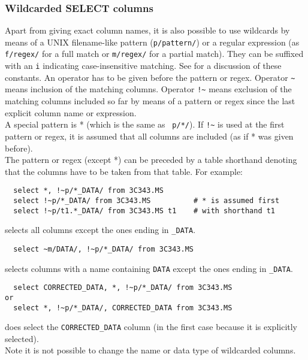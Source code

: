 \subsubsection{Wildcarded SELECT columns}
Apart from giving exact column names, it is also possible to use
wildcards by means of a UNIX filename-like pattern (\texttt{p/pattern/})
or a regular expression (as \texttt{f/regex/} for a full match or
\texttt{m/regex/} for a partial match). They can be suffixed with an
\texttt{i} indicating case-insensitive matching.
See  
for a discussion of these constants.
An operator has to be given before the pattern or regex. Operator
\verb+~+  means inclusion of the matching columns. Operator
\verb+!~+ means exclusion of the matching columns included so far by
means of a pattern or regex since the last explicit column name or expression.
\\A special pattern is * (which is the same as \texttt{~p/*/}).
If \verb+!~+ is used at the first pattern or regex, it is assumed that
all columns are included (as if * was given before).
\\The pattern or regex (except *) can be preceded by a table
shorthand denoting that the columns have to be taken from that table. 
 For example:
\begin{verbatim}
  select *, !~p/*_DATA/ from 3C343.MS
  select !~p/*_DATA/ from 3C343.MS          # * is assumed first
  select !~p/t1.*_DATA/ from 3C343.MS t1    # with shorthand t1
\end{verbatim}
selects all columns except the ones ending in \texttt{\_DATA}.
\begin{verbatim}
  select ~m/DATA/, !~p/*_DATA/ from 3C343.MS
\end{verbatim}
selects columns with a name containing \texttt{DATA} except the ones
ending in \texttt{\_DATA}.
\begin{verbatim}
  select CORRECTED_DATA, *, !~p/*_DATA/ from 3C343.MS
or
  select *, !~p/*_DATA/, CORRECTED_DATA from 3C343.MS
\end{verbatim}
does select the \texttt{CORRECTED\_DATA} column (in the first case
because it is explicitly selected).
\\Note it is not possible to change the name or data type of
wildcarded columns.

